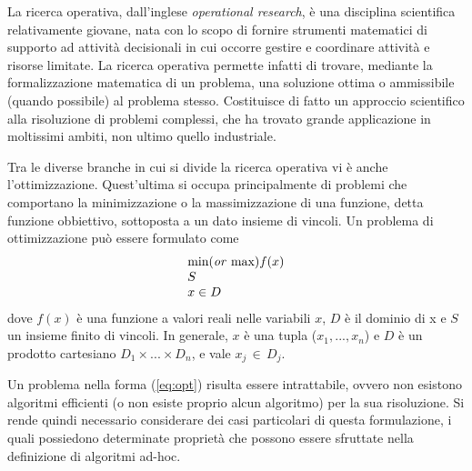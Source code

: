 La ricerca operativa, dall'inglese \textit{operational research}, è una disciplina scientifica relativamente 
giovane, nata con lo scopo di fornire strumenti matematici di supporto ad attività decisionali in cui occorre gestire e coordinare 
attività e risorse limitate. La ricerca operativa permette infatti di trovare, mediante la formalizzazione 
matematica di un problema, una soluzione ottima o ammissibile (quando possibile) al problema stesso. 
Costituisce di fatto un approccio scientifico alla risoluzione di problemi 
complessi, che ha trovato grande applicazione in moltissimi ambiti, non ultimo quello industriale. 

Tra le diverse branche in cui si divide la ricerca operativa vi è anche l'ottimizzazione. 
Quest'ultima si occupa principalmente di problemi che comportano la minimizzazione o la massimizzazione di una funzione, detta funzione
obbiettivo, sottoposta a un dato insieme di vincoli. 
Un problema di ottimizzazione può essere formulato come 
\begin{align}
	\label{eq:opt}
	\begin{array}{l}
      \text{min(\textit{or} max)}f(x)\\
      S	\\
      x \in D
    \end{array}
\end{align}
dove $f(x)$ è una funzione a valori reali nelle variabili $x$, $D$ è il dominio di x e $S$ un insieme finito di vincoli. In generale,  
$x$ è una tupla ($x_1,...,x_n$) e $D$ è un prodotto cartesiano $D_1 \times ... \times D_n$, e vale $x_j \, \in \, D_j$. 

Un problema nella forma (\ref{eq:opt}) risulta essere intrattabile, ovvero non esistono algoritmi efficienti (o non esiste proprio
alcun algoritmo) per la sua risoluzione. Si rende quindi necessario considerare dei casi particolari di questa formulazione, i quali 
possiedono determinate proprietà che possono essere sfruttate nella definizione di algoritmi ad-hoc.
\newpage

